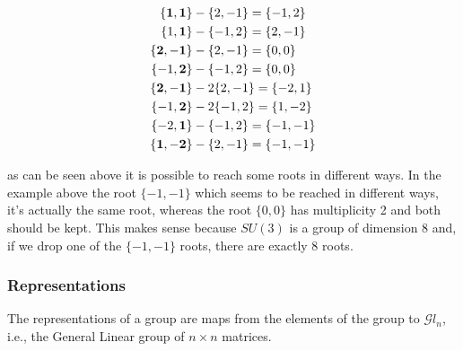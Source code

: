 \documentclass[12pt]{article}
\begin{document}
\begin{align}
\{\bf{1}, 1\} &- \{2, -1\} = \{-1, 2\} \notag  \\
\{1, \bf{1}\} &- \{-1, 2\} = \{2, -1\} \notag  \\
\{\bf{2}, -1\} &- \{2, -1\} = \{0, 0\} \notag  \\
\{-1, \bf{2}\} &- \{-1, 2\} = \{0, 0\} \notag  \\
\{\bf{2}, -1\} &- 2 \{2, -1\} = \{-2, 1\} \notag  \\
\{-1, \bf{2}\} &- 2 \{-1, 2\} = \{1,-2\} \notag  \\
\{-2, \bf{1}\} &- \{-1, 2\} = \{-1,-1\} \notag  \\
\{\bf{1}, -2\} &- \{2, -1\} = \{-1, -1\} \notag  \\
\end{align}

as can be seen above it is possible to reach some roots in different ways. In the example above the root $\{-1, -1\}$ which seems to be reached in different ways, it's actually the same root, whereas the root $\{0, 0 \}$ has multiplicity 2 and both should be kept. This makes sense because $SU(3)$ is a group of dimension 8 and, if we drop one of the $\{-1, -1\}$ roots, there are exactly 8 roots.

\subsubsection{Representations}

The representations of a group are maps from the elements of the group to $\mathcal{G}l_n$, i.e., the General Linear group of $n \times n$ matrices.
\end{document}
